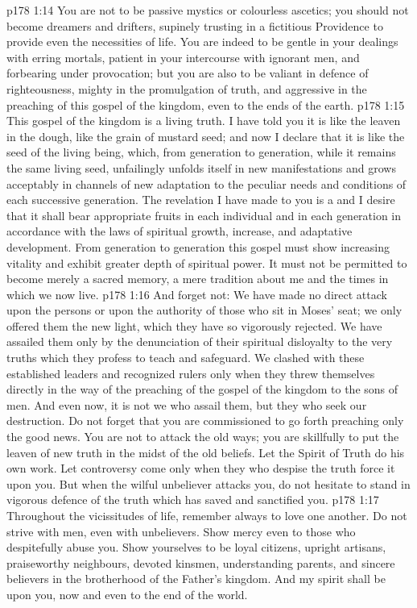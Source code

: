 \vs p178 1:14 You are not to be passive mystics or colourless ascetics; you should not become dreamers and drifters, supinely trusting in a fictitious Providence to provide even the necessities of life. You are indeed to be gentle in your dealings with erring mortals, patient in your intercourse with ignorant men, and forbearing under provocation; but you are also to be valiant in defence of righteousness, mighty in the promulgation of truth, and aggressive in the preaching of this gospel of the kingdom, even to the ends of the earth.
\vs p178 1:15 This gospel of the kingdom is a living truth. I have told you it is like the leaven in the dough, like the grain of mustard seed; and now I declare that it is like the seed of the living being, which, from generation to generation, while it remains the same living seed, unfailingly unfolds itself in new manifestations and grows acceptably in channels of new adaptation to the peculiar needs and conditions of each successive generation. The revelation I have made to you is a  and I desire that it shall bear appropriate fruits in each individual and in each generation in accordance with the laws of spiritual growth, increase, and adaptative development. From generation to generation this gospel must show increasing vitality and exhibit greater depth of spiritual power. It must not be permitted to become merely a sacred memory, a mere tradition about me and the times in which we now live.
\vs p178 1:16 And forget not: We have made no direct attack upon the persons or upon the authority of those who sit in Moses’ seat; we only offered them the new light, which they have so vigorously rejected. We have assailed them only by the denunciation of their spiritual disloyalty to the very truths which they profess to teach and safeguard. We clashed with these established leaders and recognized rulers only when they threw themselves directly in the way of the preaching of the gospel of the kingdom to the sons of men. And even now, it is not we who assail them, but they who seek our destruction. Do not forget that you are commissioned to go forth preaching only the good news. You are not to attack the old ways; you are skillfully to put the leaven of new truth in the midst of the old beliefs. Let the Spirit of Truth do his own work. Let controversy come only when they who despise the truth force it upon you. But when the wilful unbeliever attacks you, do not hesitate to stand in vigorous defence of the truth which has saved and sanctified you.
\vs p178 1:17 Throughout the vicissitudes of life, remember always to love one another. Do not strive with men, even with unbelievers. Show mercy even to those who despitefully abuse you. Show yourselves to be loyal citizens, upright artisans, praiseworthy neighbours, devoted kinsmen, understanding parents, and sincere believers in the brotherhood of the Father’s kingdom. And my spirit shall be upon you, now and even to the end of the world.
